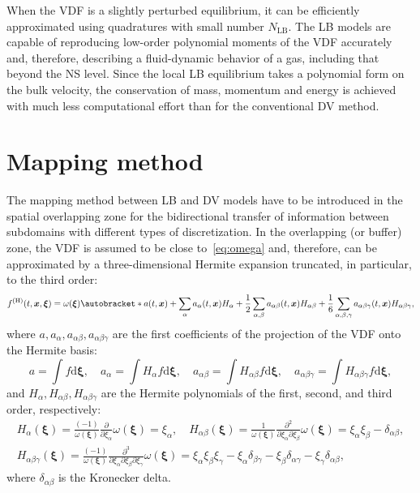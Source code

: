 \documentclass{article}
\newcommand{\dd}{\mathrm{d}}
\newcommand{\pder}[2][]{\frac{\partial#1}{\partial#2}}
\newcommand{\pderder}[3][]{\frac{\partial^2#1}{\partial#2\partial#3}}
\newcommand{\pderderder}[4][]{\frac{\partial^3#1}{\partial#2\partial#3\partial#4}}
\DeclarePairedDelimiter\autobracket()       %
\newcommand{\br}[1]{\autobracket*{#1}}
\newcommand{\dxi}{\boldsymbol{\dd\xi}}
\newcommand{\bxi}{{\boldsymbol{\xi}}}
\newcommand{\bx}{\boldsymbol{x}}
\newcommand{\hermite}[1]{#1^\mathrm{(H)}}
\newcommand{\LB}{\mathrm{LB}}
\newcommand{\Aa}{a_{\alpha}}
\newcommand{\Aab}{a_{\alpha\beta}}
\newcommand{\Aabg}{a_{\alpha\beta\gamma}}
\newcommand{\Ha}{H_{\alpha}}
\newcommand{\Hab}{H_{\alpha\beta}}
\newcommand{\Habg}{H_{\alpha\beta\gamma}}
\newcommand{\xia}{\xi_{\alpha}}
\newcommand{\xib}{\xi_{\beta}}
\newcommand{\xig}{\xi_{\gamma}}
\begin{document}
When the VDF is a slightly perturbed equilibrium,
it can be efficiently approximated using quadratures with small number \(N_\LB\).
The LB models are capable of reproducing low-order polynomial moments of the VDF accurately and,
therefore, describing a fluid-dynamic behavior of a gas, including that beyond the NS level.
Since the local LB equilibrium takes a polynomial form on the bulk velocity,
the conservation of mass, momentum and energy is achieved
with much less computational effort than for the conventional DV method.

\section{Mapping method}\label{sec:mapping}

The mapping method between LB and DV models have to be introduced in the spatial overlapping zone
for the bidirectional transfer of information between subdomains with different types of discretization.
In the overlapping (or buffer) zone, the VDF is assumed to be close to~\eqref{eq:omega}
and, therefore, can be approximated by a three-dimensional Hermite expansion
truncated, in particular, to the third order:
\begin{equation}\label{eq:grad}
    \hermite{f}(t,\bx,\bxi) = \omega(\bxi)\br{ a(t,\bx)
        + \sum_{\alpha} \Aa(t,\bx) \Ha
        + \frac12 \sum_{\alpha,\beta} \Aab(t,\bx) \Hab
        + \frac16 \sum_{\alpha,\beta,\gamma} \Aabg(t,\bx) \Habg
    },
\end{equation}
where \(a, \Aa, \Aab, \Aabg\) are the first coefficients of the projection of the VDF onto the Hermite basis:
\begin{equation}\label{eq:a_coeffs}
    a = \int f\dxi, \quad \Aa = \int \Ha f\dxi, \quad \Aab = \int \Hab f\dxi, \quad \Aabg = \int \Habg f\dxi,
\end{equation}
and $\Ha, \Hab, \Habg$ are the Hermite polynomials of the first, second, and third order, respectively:
\begin{equation}\label{eq:Hermite_polynomials}
    \begin{gathered}
    \Ha(\bxi) = \frac{(-1)}{\omega(\bxi)}\pder{\xia}\omega(\bxi) = \xia, \quad
    \Hab(\bxi) = \frac{1}{\omega(\bxi)}\pderder{\xia}{\xib}\omega(\bxi) = \xia\xib - \delta_{\alpha\beta}, \\
    \Habg(\bxi) = \frac{(-1)}{\omega(\bxi)}\pderderder{\xia}{\xib}{\xig}\omega(\bxi)
        = \xia\xib\xig - \xia\delta_{\beta\gamma} - \xib\delta_{\alpha\gamma} - \xig\delta_{\alpha\beta},
    \end{gathered}
\end{equation}
where \(\delta_{\alpha\beta}\) is the Kronecker delta.
\end{document}
